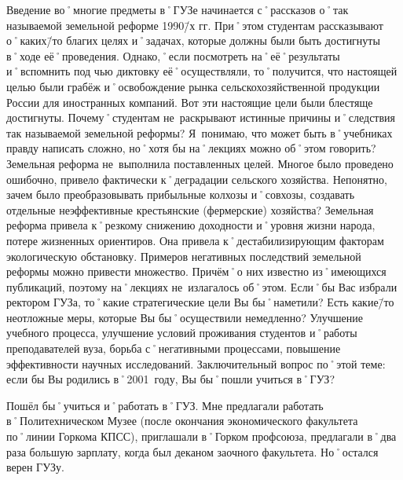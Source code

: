 \begin{drama}
	\maxspeaks Введение во˚многие предметы в˚ГУЗе начинается с˚рассказов о˚так называемой земельной реформе 1990\=/х гг. При˚этом студентам рассказывают о˚каких\=/то благих целях и˚задачах, которые должны были быть достигнуты в˚ходе её˚проведения. Однако,˚если посмотреть на˚её˚результаты и˚вспомнить под чью диктовку её˚осуществляли, то˚получится, что настоящей целью были грабёж и˚освобождение рынка сельскохозяйственной продукции России для иностранных компаний. Вот эти настоящие цели были блестяще достигнуты. 
Почему˚студентам не~раскрывают истинные причины и˚следствия так называемой земельной реформы? Я~понимаю, что может быть в˚учебниках правду написать сложно, но˚хотя бы на˚лекциях можно об˚этом говорить?
	\michaelspeaks Земельная реформа не~выполнила поставленных целей. Многое было проведено ошибочно, привело фактически к˚деградации сельского хозяйства. Непонятно, зачем было преобразовывать прибыльные колхозы и˚совхозы, создавать отдельные неэффективные крестьянские (фермерские) хозяйства?
	Земельная реформа привела к˚резкому снижению доходности и˚уровня жизни народа, потере жизненных ориентиров. Она привела к˚дестабилизирующим факторам экологическую обстановку. Примеров негативных последствий земельной реформы можно привести множество. Причём˚о них известно из˚имеющихся публикаций, поэтому на˚лекциях не~излагалось об˚этом.
	\maxspeaks Если˚бы Вас избрали ректором ГУЗа, то˚какие стратегические цели Вы бы˚наметили? Есть какие\=/то неотложные меры, которые Вы бы˚осуществили немедленно?
	\michaelspeaks Улучшение учебного процесса, улучшение условий проживания студентов и˚работы преподавателей вуза, борьба с˚негативными процессами, повышение эффективности научных исследований.
	\maxspeaks Заключительный вопрос по˚этой теме: если бы Вы родились в˚2001~году, Вы бы˚пошли учиться в˚ГУЗ?
	
	\pagebreak
	
	\michaelspeaks Пошёл бы˚учиться и˚работать в˚ГУЗ. Мне предлагали работать в˚Политехническом Музее (после окончания экономического факультета по˚линии Горкома КПСС), приглашали в˚Горком профсоюза, предлагали в˚два раза большую зарплату, когда был деканом заочного факультета. Но˚остался верен ГУЗу.


\end{drama}
